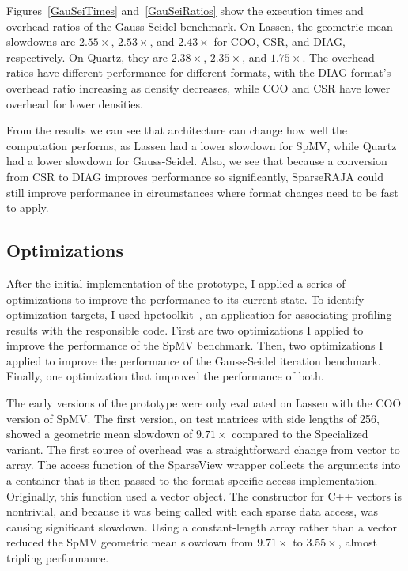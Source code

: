 Figures~\ref{GauSeiTimes} and~\ref{GauSeiRatios} show the execution times and overhead ratios of the Gauss-Seidel benchmark.
On Lassen, the geometric mean slowdowns are $2.55\times$, $2.53\times$, and $2.43\times$ for COO, CSR, and DIAG, respectively.
On Quartz, they are $2.38\times$, $2.35\times$, and $1.75\times$.
The overhead ratios have different performance for different formats, with the DIAG format's overhead ratio increasing as density decreases, while COO and CSR have lower overhead for lower densities.

From the results we can see that architecture can change how well the computation performs, as Lassen had a lower slowdown for SpMV, while Quartz had a lower slowdown for Gauss-Seidel.
Also, we see that because a conversion from CSR to DIAG improves performance so significantly, SparseRAJA could still improve performance in circumstances where format changes need to be fast to apply.



\subsection{Optimizations}

After the initial implementation of the prototype, I applied a series of optimizations to improve the performance to its current state.
To identify optimization targets, I used hpctoolkit~\cite{adhianto2010hpctoolkit}, an application for associating profiling results with the responsible code.
First are two optimizations I applied to improve the performance of the SpMV benchmark.
Then, two optimizations I applied to improve the performance of the Gauss-Seidel iteration benchmark.
Finally, one optimization that improved the performance of both.

The early versions of the prototype were only evaluated on Lassen with the COO version of SpMV\@.
The first version, on test matrices with side lengths of 256, showed a geometric mean slowdown of $9.71\times$ compared to the Specialized variant.
The first source of overhead was a straightforward change from vector to array.
The access function of the SparseView wrapper collects the arguments into a container that is then passed to the format-specific access implementation.
Originally, this function used a vector object.
The constructor for C++ vectors is nontrivial, and because it was being called with each sparse data access, was causing significant slowdown.
Using a constant-length array rather than a vector reduced the SpMV geometric mean slowdown from $9.71\times$ to $3.55\times$, almost tripling performance.

